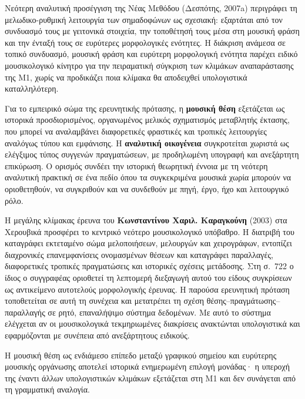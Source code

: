 \documentclass[11pt,a4paper]{article}
\begin{document}
Νεότερη αναλυτική προσέγγιση της Νέας Μεθόδου (Δεσπότης, 2007a) περιγράφει τη μελωδικο-ρυθμική λειτουργία των σημαδοφώνων ως σχεσιακή: εξαρτάται από τον συνδυασμό τους με γειτονικά στοιχεία, την τοποθέτησή τους μέσα στη μουσική φράση και την ένταξή τους σε ευρύτερες μορφολογικές ενότητες. Η διάκριση ανάμεσα σε τοπικό συνδυασμό, μουσική φράση και ευρύτερη μορφολογική ενότητα παρέχει ειδικό μουσικολογικό κίνητρο για την πειραματική σύγκριση των κλιμάκων αναπαράστασης της M1, χωρίς να προδικάζει ποια κλίμακα θα αποδειχθεί υπολογιστικά καταλληλότερη.

Για το εμπειρικό σώμα της ερευνητικής πρότασης, η \textbf{μουσική θέση} εξετάζεται ως ιστορικά προσδιορισμένος, οργανωμένος μελικός σχηματισμός μεταβλητής έκτασης, που μπορεί να αναλαμβάνει διαφορετικές φραστικές και τροπικές λειτουργίες αναλόγως τύπου και εμφάνισης. Η \textbf{αναλυτική οικογένεια} συγκροτείται χωριστά ως ελέγξιμος τύπος συγγενών πραγματώσεων, με προδηλωμένη υπογραφή και ανεξάρτητη επικύρωση. Ο ορισμός συνδέει την ιστορική θεωρητική έννοια με τη νεότερη αναλυτική πρακτική σε ένα πεδίο όπου τα συγκεκριμένα μουσικά χωρία μπορούν να οριοθετηθούν, να συγκριθούν και να συνδεθούν με πηγή, έργο, ήχο και λειτουργικό ρόλο.

Η μεγάλης κλίμακας έρευνα του \textbf{Κωνσταντίνου Χαριλ. Καραγκούνη} (2003) στα Χερουβικά προσφέρει το κεντρικό νεότερο μουσικολογικό υπόβαθρο. Η διατριβή του καταγράφει εκτεταμένο σώμα μελοποιήσεων, μελουργών και χειρογράφων, εντοπίζει διαχρονικές επανεμφανίσεις ονομασμένων θέσεων και καταγράφει παραλλαγές, διαφορετικές τροπικές πραγματώσεις και ιστορικές σχέσεις μετάδοσης. Στη σ.~722 ο ίδιος ο συγγραφέας οριοθετεί τη λεπτομερή διεξαγωγή αυτού του είδους συγκρίσεων ως αντικείμενο αυτοτελούς μορφολογικής έρευνας. Η παρούσα ερευνητική πρόταση τοποθετείται σε αυτή τη συνέχεια και μετατρέπει τη σχέση θέσης--πραγμάτωσης--παραλλαγής σε ρητό, επαναλήψιμο σύστημα δεδομένων. Με αυτό το σύστημα ελέγχεται αν οι μουσικολογικά τεκμηριωμένες διακρίσεις ανακτώνται υπολογιστικά και εφαρμόζονται με συνέπεια από ανεξάρτητους ειδικούς.

Η μουσική θέση ως ενδιάμεσο επίπεδο μεταξύ γραφικού σημείου και ευρύτερης μουσικής οργάνωσης αποτελεί ιστορικά ενημερωμένη επιλογή μονάδας· η υπεροχή της έναντι άλλων υπολογιστικών κλιμάκων εξετάζεται στη M1 και δεν συνάγεται από τη γραμματική αναλογία.
\end{document}
